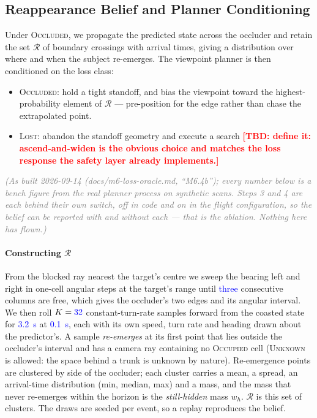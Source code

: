 \documentclass[conference]{IEEEtran}
\newcommand{\tbd}[1]{\textcolor{red}{\textbf{[TBD: #1]}}}
\newcommand{\bench}[1]{\textcolor{blue}{#1}}
\newcommand{\note}[1]{\textcolor{gray}{\textit{(#1)}}}
\newcommand{\occluded}{\textsc{Occluded}}
\newcommand{\lost}{\textsc{Lost}}
\begin{document}
\subsection{Reappearance Belief and Planner Conditioning}
\label{sec:reappear}
Under \occluded{}, we propagate the predicted state across the occluder and
retain the set $\mathcal{R}$ of boundary crossings with arrival times, giving a
distribution over where and when the subject re-emerges. The viewpoint planner is
then conditioned on the loss class:

\begin{itemize}
  \item \occluded{}: hold a tight standoff, and bias the viewpoint toward the
        highest-probability element of $\mathcal{R}$ --- pre-position for the
        edge rather than chase the extrapolated point.
  \item \lost{}: abandon the standoff geometry and execute a search
        \tbd{define it: ascend-and-widen is the obvious choice and matches the
        loss response the safety layer already implements.}
\end{itemize}

\note{As built 2026-09-14 (docs/m6-loss-oracle.md, ``M6.4b''); every number below is a bench
figure from the real planner process on synthetic scans. Steps 3 and 4 are each behind their
own switch, off in code and on in the flight configuration, so the belief can be reported with
and without each --- that is the ablation. Nothing here has flown.}

\paragraph{Constructing $\mathcal{R}$} From the blocked ray nearest the target's
centre we sweep the bearing left and right in one-cell angular steps at the
target's range until \bench{three} consecutive columns are free, which gives the
occluder's two edges and its angular interval. We then roll $K=\bench{32}$
constant-turn-rate samples forward from the coasted state for \bench{\SI{3.2}{\second}}
at \bench{\SI{0.1}{\second}}, each with its own speed, turn rate and heading drawn about
the predictor's. A sample \emph{re-emerges} at its first point that lies outside the
occluder's interval and has a camera ray containing no \textsc{Occupied} cell
(\textsc{Unknown} is allowed: the space behind a trunk is unknown by nature).
Re-emergence points are clustered by side of the occluder; each cluster carries a
mean, a spread, an arrival-time distribution (min, median, max) and a mass, and
the mass that never re-emerges within the horizon is the \emph{still-hidden}
mass $w_h$. $\mathcal{R}$ is this set of clusters. The draws are seeded per event, so
a replay reproduces the belief.
\end{document}
